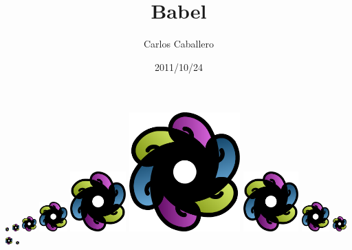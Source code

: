 \documentclass[11pt]{beamer}
\title{\bf Babel}
\author{Carlos Caballero}
\institute{scesi}
\date{2011/10/24}
\begin{document}
\begin{frame}
\hspace*{0.22cm}
\includegraphics[width=0.01\textwidth]{img/babel.png}
\includegraphics[width=0.02\textwidth]{img/babel.png}
\includegraphics[width=0.04\textwidth]{img/babel.png}
\includegraphics[width=0.08\textwidth]{img/babel.png}
\includegraphics[width=0.16\textwidth]{img/babel.png}
\includegraphics[width=0.32\textwidth]{img/babel.png}
\includegraphics[width=0.16\textwidth]{img/babel.png}
\includegraphics[width=0.08\textwidth]{img/babel.png}
\includegraphics[width=0.04\textwidth]{img/babel.png}
\includegraphics[width=0.02\textwidth]{img/babel.png}
\includegraphics[width=0.01\textwidth]{img/babel.png}
\titlepage
\end{frame}
\end{document}
